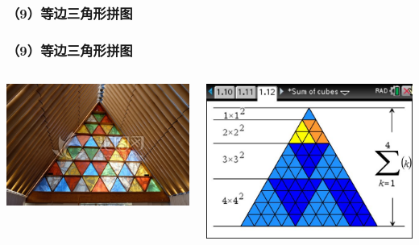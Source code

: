 \documentclass[aspectratio=169]{beamer}
\begin{document}
\subsubsection{（9）等边三角形拼图}
        \begin{frame}
        \frametitle{（9）等边三角形拼图}
        \begin{columns}
        	\includegraphics[scale=0.375]{三角形教堂屋顶.jpg}
        	
        	\includegraphics[scale=0.3]{等边三角形拼图.jpg}
        \end{columns}      
    \end{frame}
\end{document}

